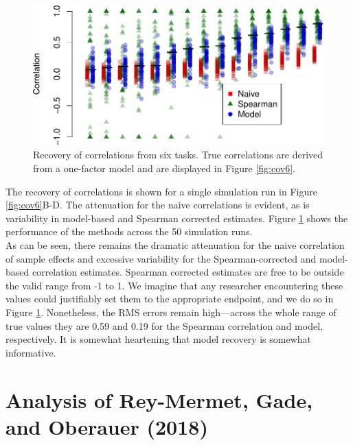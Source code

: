 \documentclass[
  english,
  ,man]{apa6}
\begin{document}
\begin{figure}
\centering
\includegraphics{p_files/figure-latex/recov6-1.pdf}
\caption{\label{fig:recov6}Recovery of correlations from six tasks. True correlations are derived from a one-factor model and are displayed in Figure \ref{fig:cov6}.}
\end{figure}

The recovery of correlations is shown for a single simulation run in Figure \ref{fig:cov6}B-D. The attenuation for the naive correlations is evident, as is variability in model-based and Spearman corrected estimates. Figure \ref{fig:recov6} shows the performance of the methods across the 50 simulation runs.\\
As can be seen, there remains the dramatic attenuation for the naive correlation of sample effects and excessive variability for the Spearman-corrected and model-based correlation estimates. Spearman corrected estimates are free to be outside the valid range from -1 to 1. We imagine that any researcher encountering these values could justifiably set them to the appropriate endpoint, and we do so in Figure \ref{fig:recov6}. Nonetheless, the RMS errors remain high---across the whole range of true values they are 0.59 and 0.19 for the Spearman correlation and model, respectively. It is somewhat heartening that model recovery is somewhat informative.

\hypertarget{analysis-of-rey-mermet-gade-and-oberauer-2018}{%
\section{Analysis of Rey-Mermet, Gade, and Oberauer (2018)}\label{analysis-of-rey-mermet-gade-and-oberauer-2018}}
\end{document}
